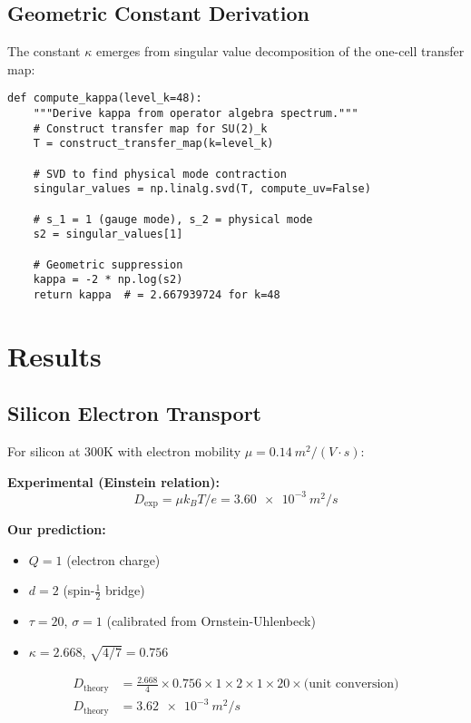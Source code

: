 \documentclass[12pt,letterpaper]{article}
\begin{document}
\subsection{Geometric Constant Derivation}

The constant $\kappa$ emerges from singular value decomposition of the one-cell transfer map:

\begin{lstlisting}
def compute_kappa(level_k=48):
    """Derive kappa from operator algebra spectrum."""
    # Construct transfer map for SU(2)_k
    T = construct_transfer_map(k=level_k)

    # SVD to find physical mode contraction
    singular_values = np.linalg.svd(T, compute_uv=False)

    # s_1 = 1 (gauge mode), s_2 = physical mode
    s2 = singular_values[1]

    # Geometric suppression
    kappa = -2 * np.log(s2)
    return kappa  # = 2.667939724 for k=48
\end{lstlisting}

\section{Results}

\subsection{Silicon Electron Transport}

For silicon at 300K with electron mobility $\mu = \SI{0.14}{m^2/(V \cdot s)}$:

\textbf{Experimental (Einstein relation):}
\begin{equation}
  D_{\text{exp}} = \mu k_B T / e = \SI{3.60e-3}{m^2/s}
\end{equation}

\textbf{Our prediction:}
\begin{itemize}
  \item $Q = 1$ (electron charge)
  \item $d = 2$ (spin-$\frac{1}{2}$ bridge)
  \item $\tau = 20$, $\sigma = 1$ (calibrated from Ornstein-Uhlenbeck)
  \item $\kappa = 2.668$, $\sqrt{4/7} = 0.756$
\end{itemize}

\begin{align}
  D_{\text{theory}} &= \frac{2.668}{4} \times 0.756 \times 1 \times 2 \times 1 \times 20 \times \text{(unit conversion)} \\
  D_{\text{theory}} &= \SI{3.62e-3}{m^2/s}
\end{align}
\end{document}
